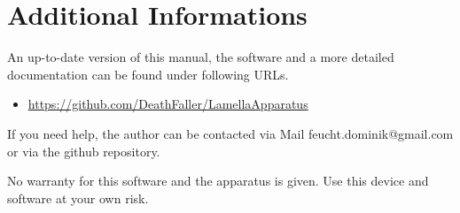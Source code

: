 \chapter{Additional Informations}

An up-to-date version of this manual, the software and a more detailed documentation can be found under following URLs.
\begin{itemize}
\item\url{https://github.com/DeathFaller/LamellaApparatus}
\end{itemize}
If you need help, the author can be contacted via Mail feucht.dominik@gmail.com or via the github repository. 

No warranty for this software and the apparatus is given. 
Use this device and software at your own risk. 
